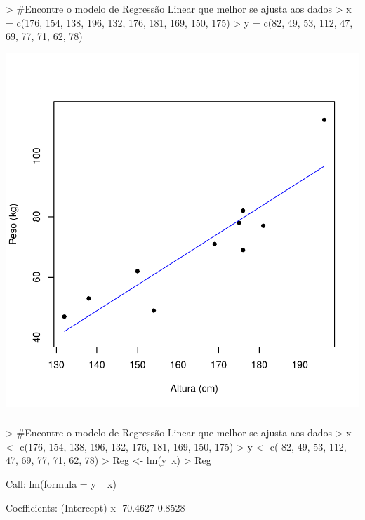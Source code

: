 \documentclass[14pt,aspectratio=1610]{beamer}
\begin{document}
\begin{frame}[fragile]{}
\frametitle{ }
\begin{block}{}
\begin{center}
\begin{Schunk}
\begin{Sinput}
> #Encontre o modelo de Regressão Linear que melhor se ajusta aos dados
> x = c(176, 154, 138, 196, 132, 176, 181, 169, 150, 175)
> y = c(82, 49, 53, 112, 47, 69, 77, 71, 62, 78)
\end{Sinput}
\end{Schunk}
\end{center}
\end{block}
\vspace{-1.3cm}
\begin{center}
\includegraphics{Aula17-008}
\end{center}
\end{frame}

\begin{frame}[fragile]{}
\frametitle{ }
\begin{block}{}
\begin{center}
\begin{Schunk}
\begin{Sinput}
> #Encontre o modelo de Regressão Linear que melhor se ajusta aos dados
> x <-  c(176, 154, 138, 196, 132, 176, 181, 169, 150, 175)
> y <-  c( 82,  49,  53, 112,  47,  69,  77,  71,  62,  78)
> Reg <- lm(y~x)
> Reg
\end{Sinput}
\begin{Soutput}
Call:
lm(formula = y ~ x)

Coefficients:
(Intercept)            x  
   -70.4627       0.8528  
\end{Soutput}
\end{Schunk}
\end{center}
\end{block}
\end{frame}
\end{document}
